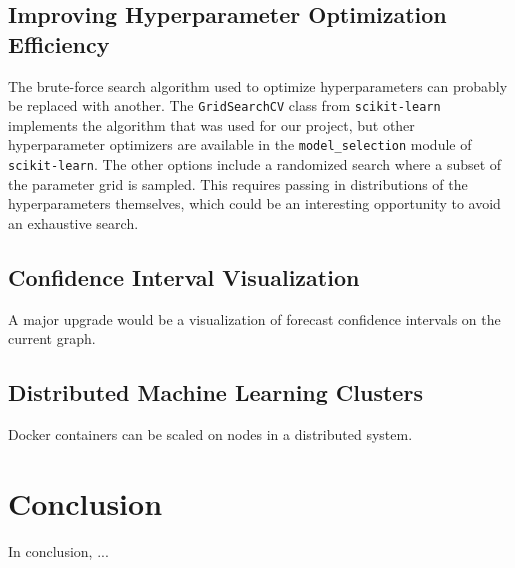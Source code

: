 \documentclass[11pt, oneside]{article}
\begin{document}
\subsection{Improving Hyperparameter Optimization Efficiency}
  \label{improving_hyperparameter_optimization_efficiency}
  The brute-force search algorithm used to optimize hyperparameters can probably be replaced with another. The \texttt{GridSearchCV} class from \texttt{scikit-learn} implements the algorithm that was used for our project, but other hyperparameter optimizers are available in the \texttt{model\_selection} module of \texttt{scikit-learn}. The other options include a randomized search where a subset of the parameter grid is sampled. This requires passing in distributions of the hyperparameters themselves, which could be an interesting opportunity to avoid an exhaustive search.

\subsection{Confidence Interval Visualization}
A major upgrade would be a visualization of forecast confidence intervals on the current graph.

\subsection{Distributed Machine Learning Clusters}
\label{distributed_machine_learning_clusters}
Docker containers can be scaled on nodes in a distributed system.

\section{Conclusion}
In conclusion, ...
\end{document}
